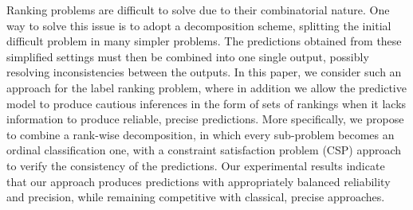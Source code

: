 
Ranking problems are difficult to solve due to their combinatorial nature. One way to solve this issue is to adopt a decomposition scheme, splitting the initial difficult problem in many simpler problems. The predictions obtained from these simplified settings must then be combined into one single output, possibly resolving inconsistencies between the outputs. In this paper, we consider such an approach for the label ranking problem, where in addition we allow the predictive model to produce cautious inferences in the form of sets of rankings when it lacks information to produce reliable, precise predictions. More specifically, we propose to combine a rank-wise decomposition, in which every sub-problem becomes an ordinal classification one, with a constraint satisfaction problem (CSP) approach to verify the consistency of the predictions. Our experimental results indicate that our approach produces predictions with appropriately balanced reliability and precision, while remaining competitive with classical, precise approaches.


